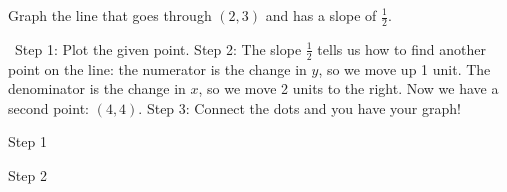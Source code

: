\begin{boxedex}
Graph the line that goes through $(2,3)$ and has a slope of $\frac{1}{2}$.

\exsoln\ Step 1: Plot the given point. Step 2: The slope $\frac{1}{2}$ tells us how to find another point on the line: the numerator is the change in $y$, so we move up 1 unit. The denominator is the change in $x$, so we move 2 units to the right. Now we have a second point: $(4,4)$. Step 3: Connect the dots and you have your graph!

\begin{center}
\begin{minipage}{0.32\textwidth}
	\centering
	Step 1\par\medskip
%
\end{minipage}
%
\begin{minipage}{0.32\textwidth}
	\centering
	Step 2\par\medskip

\end{minipage}
\end{center}
\end{boxedex}
